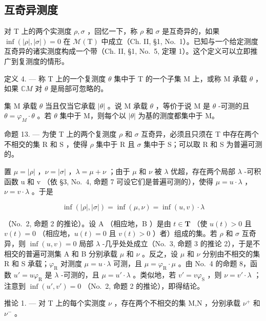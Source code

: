 \subsection{互奇异测度}

对 T 上的两个实测度 \(\rho,\sigma\) ，回忆一下，称 \(\rho\) 和 \(\sigma\) 是互奇异的，如果 \(\inf(|\rho|,|\sigma|)=0\) 在 \(\mathcal{M}(\mathrm{T})\) 中成立（Ch. II, §1, No.~1）。已知与一个给定测度互奇异的诸实测度构成一个带（Ch. II, §1, No.~5, 定理 1）。这个定义可以立即推广到复测度的情形。

定义 4. --- 称 T 上的一个复测度 \(\theta\) 集中于 T 的一个子集 M 上，或称 M 承载 \(\theta\) ，如果 \(\mathbb{C}M\) 对 \(\theta\) 是局部可忽略的。

集 M 承载 \(\theta\) 当且仅当它承载 \(|\theta|\) 。说 M 承载 \(\theta\) ，等价于说 M 是 \(\theta\) -可测的且 \(\theta = \varphi_{M} \cdot \theta\) 。若 \(\theta\) 集中于 M，则每个以 \(|\theta|\) 为基的测度都集中于 M。

命题 13. --- 为使 T 上的两个复测度 \(\rho\) 和 \(\sigma\) 互奇异，必须且只须在 T 中存在两个不相交的集 R 和 S ，使得 \(\rho\) 集中于 R 且 \(\sigma\) 集中于 S；可以取 R 和 S 为普遍可测的。

置 \(\mu = |\rho|\) ，\(\nu = |\sigma|\) ，\(\lambda = \mu + \nu\) ；由于 \(\mu\) 和 \(\nu\) 被 \(\lambda\) 优超，存在两个局部 \(\lambda\) -可积函数 u 和 v （依 §3, No.~4, 命题 7 可设它们是普遍可测的），使得 \(\mu = u \cdot \lambda\) ，\(\nu = v \cdot \lambda\) 。于是

\[
\inf (| \rho |, | \sigma |) = \inf (\mu , \nu) = \inf (u, v) \cdot \lambda
\]

（No.~2, 命题 2 的推论）。设 A （相应地，B ）是由 \(t \in \mathbf{T}\) （使 \(u(t) > 0\) 且 \(v(t) = 0\) （相应地，\(u(t) = 0\) 且 \(v(t) > 0\) ）者）组成的集。若 \(\rho\) 和 \(\sigma\) 互奇异，则 \(\inf(u, v) = 0\) 局部 \(\lambda\) -几乎处处成立（No.~3, 命题 3 的推论 2），于是不相交的普遍可测集 A 和 B 分别承载 \(\mu\) 和 \(\nu\) 。反之，设 \(\mu\) 和 \(\nu\) 分别由不相交的集 R 和 S 承载；\(\varphi_{\mathrm{R}}\) 对测度 \(\mu = u \cdot \lambda\) 可测，且 \(\mu = \varphi_{\mathrm{R}} \cdot \mu\) 。由 No.~4 的命题 8，函数 \(u' = u\varphi_{\mathrm{R}}\) 是 \(\lambda\) -可测的，且 \(\mu = u' \cdot \lambda\) 。类似地，若 \(v' = v\varphi_{\mathrm{S}}\) ，则 \(\nu = v' \cdot \lambda\) ；注意到 \(\inf(u', v') = 0\) （No.~2, 命题 2 的推论），即得结论。

推论 1. --- 对 T 上的每个实测度 \(\nu\) ，存在两个不相交的集 M,N ，分别承载 \(\nu^{+}\) 和 \(\nu^{-}\) 。

